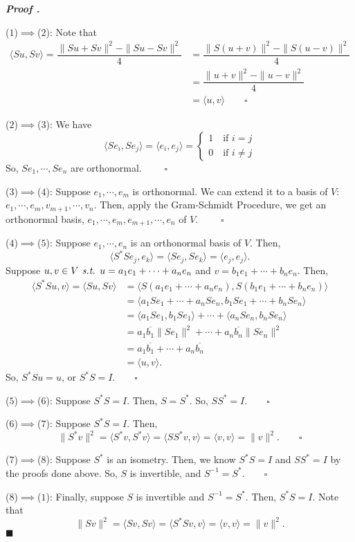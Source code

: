 \documentclass[11pt, letterpaper]{article}
\newcounter{nprf}[subsection]
\newenvironment*{prf}{\par\indent\textbf{\textit{Proof \stepcounter{nprf}\thenprf.}}}{\hfill$\blacksquare$\par}
\def\st{\emph{ s.t. }}
\def\pqde{\qquad\square}
\begin{document}
\begin{prf}
	\par ($1$)$\implies$($2$): Note that \[\begin{aligned}\langle Su,Sv\rangle=\dfrac{\|Su+Sv\|^2-\|Su-Sv\|^2}{4}&=\dfrac{\|S(u+v)\|^2-\|S(u-v)\|^2}{4}\\&=\dfrac{\|u+v\|^2-\|u-v\|^2}{4}\\&=\langle u,v\rangle\pqde\end{aligned}\]	
	\par ($2$)$\implies$($3$): We have \[\langle Se_i,Se_j\rangle=\langle e_i,e_j\rangle=\begin{cases}1\quad\text{if }i=j\\0\quad\text{if }i\neq j\end{cases}\] So, $Se_1,\cdots,Se_n$ are orthonormal. $\pqde$
	\par ($3$)$\implies$($4$): Suppose $e_1,\cdots,e_m$ is orthonormal. We can extend it to a basis of $V$: $e_1,\cdots,e_m,v_{m+1},\cdots,v_n$. Then, apply the Gram-Schmidt Procedure, we get an orthonormal basis, $e_1,\cdots,e_m,e_{m+1},\cdots,e_n$ of $V$. $\pqde$
	\par ($4$)$\implies$($5$): Suppose $e_1,\cdots,e_n$ is an orthonormal basis of $V$. Then, \[\langle S^*Se_j,e_k\rangle=\langle Se_j,Se_k\rangle=\langle e_j,e_j\rangle.\] Suppose $u,v\in V\st u=a_1e_1+\cdots+a_ne_n$ and $v=b_1e_1+\cdots+b_ne_n$. Then, \[\begin{aligned}\langle S^*Su,v\rangle=\langle Su,Sv\rangle&=\langle S(a_1e_1+\cdots+a_ne_n),S(b_1e_1+\cdots+b_ne_n)\rangle\\&=\langle a_1Se_1+\cdots+a_nSe_n,b_1Se_1+\cdots+b_nSe_n\rangle\\&=\langle a_1Se_1,b_1Se_1\rangle+\cdots+\langle a_nSe_n,b_nSe_n\rangle\\&=a_1\overline{b_1}\|Se_1\|^2+\cdots+a_n\overline{b_n}\|Se_n\|^2\\&=a_1\overline{b_1}+\cdots+a_n\overline{b_n}\\&=\langle u,v\rangle.\end{aligned}\] So, $S^*Su=u$, or $S^*S=I.\pqde$
	\par ($5$)$\implies$($6$): Suppose $S^*S=I$. Then, $S=S^*$. So, $SS^*=I.\pqde$
	\par ($6$)$\implies$($7$): Suppose $S^*S=I$. Then, \[\|S^*v\|^2=\langle S^*v,S^*v\rangle=\langle SS^*v,v\rangle=\langle v,v\rangle=\|v\|^2.\pqde\]
	\par ($7$)$\implies$($8$): Suppose $S^*$ is an isometry. Then, we know $S^*S=I$ and $SS^*=I$ by the proofs done above. So, $S$ is invertible, and $S^{-1}=S^*.\pqde$
	\par ($8$)$\implies$($1$): Finally, suppose $S$ is invertible and $S^{-1}=S^*$. Then, $S^*S=I$. Note that \[\|Sv\|^2=\langle Sv,Sv\rangle=\langle S^*Sv,v\rangle=\langle v,v\rangle=\|v\|^2.\]
\end{prf}
\end{document}
